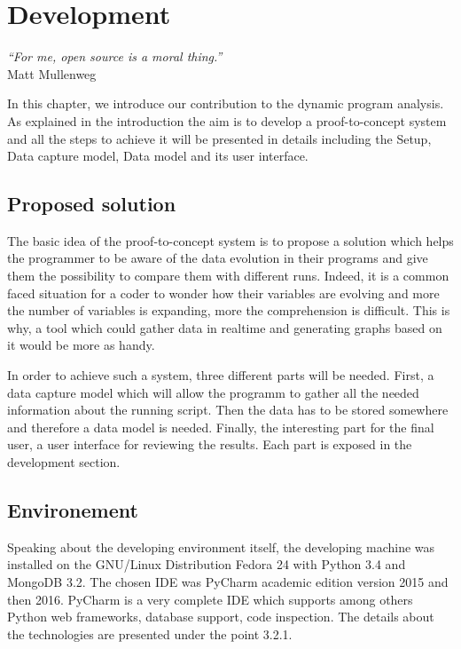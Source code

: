 
\chapter{Development} %
\label{chap:development}
\begin{flushright}
\textit{``For me, open source is a moral thing.''} \\ Matt Mullenweg
\end{flushright}

In this chapter, we introduce our contribution to the dynamic program analysis. As explained in the introduction the aim is to develop a proof-to-concept system and all the steps to achieve it will be presented in details including the Setup, Data capture model, Data model and its user interface.


\section{Proposed solution}
The basic idea of the proof-to-concept system is to propose a solution which helps the programmer to be aware of the data evolution in their programs and give them the possibility to compare them with different runs. Indeed, it is a common faced situation for a coder to wonder how their variables are evolving and more the number of variables is expanding, more the comprehension is difficult. This is why, a tool which could gather data in realtime and generating graphs based on it would be more as handy.

In order to achieve such a system, three different parts will be needed. First, a data capture model which will allow the programm to gather all the needed information about the running script. Then the data has to be stored somewhere and therefore a data model is needed. Finally, the interesting part for the final user, a user interface for reviewing the results. Each part is exposed in the development section.

\section{Environement}

Speaking about the developing environment itself, the developing machine was installed on the GNU/Linux Distribution Fedora 24 with Python 3.4 and MongoDB 3.2. The chosen IDE was PyCharm academic edition version 2015 and then 2016. PyCharm is a very complete IDE which supports among others Python web frameworks, database support, code inspection. The details about the technologies are presented under the point 3.2.1.

